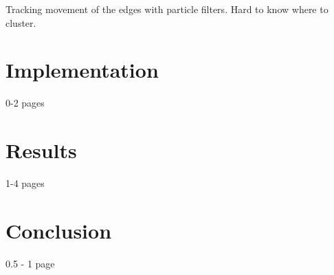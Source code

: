 \documentclass[a4paper,11pt]{article}
\begin{document}
Tracking movement of the edges with particle filters. Hard to know where to cluster. 

\section{Implementation}
0-2 pages

\section{Results}
1-4 pages

\section{Conclusion}
0.5 - 1 page

\printbibliography
\end{document}
